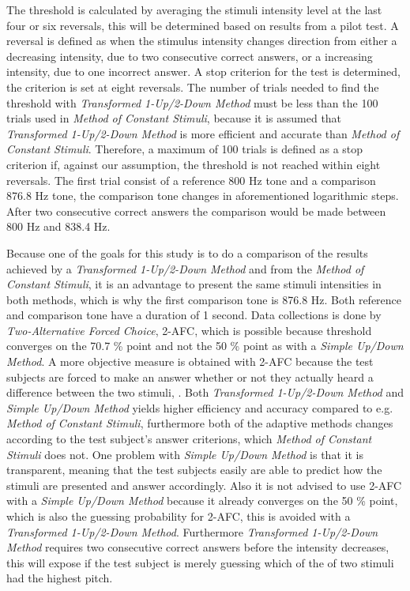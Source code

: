 \noindent
%
The threshold is calculated by averaging the stimuli intensity level at the last four or six reversals, this will be determined based on results from a pilot test. A reversal is defined as when the stimulus intensity changes direction from either a decreasing intensity, due to two consecutive correct answers, or a increasing intensity, due to one incorrect answer. A stop criterion for the test is determined, the criterion is set at eight reversals. The number of trials needed to find the threshold with  \textit{Transformed 1-Up/2-Down Method} must be less than the 100 trials used in \textit{Method of Constant Stimuli}, because it is assumed that \textit{Transformed 1-Up/2-Down Method} is more efficient and accurate than \textit{Method of Constant Stimuli}. Therefore, a maximum of 100 trials is defined as a stop criterion if, against our assumption, the threshold is not reached within eight reversals. The first trial consist of a reference 800 Hz tone and a comparison 876.8 Hz tone, the comparison tone changes in aforementioned logarithmic steps. After two consecutive correct answers the comparison would be made between 800 Hz and 838.4 Hz.

Because one of the goals for this study is to do a comparison of the results achieved by a \textit{Transformed 1-Up/2-Down Method} and from the \textit{Method of Constant Stimuli}, it is an advantage to present the same stimuli intensities in both methods, which is why the first comparison tone is 876.8 Hz. Both reference and comparison tone have a duration of 1 second.\blankline
%               
Data collections is done by \textit{Two-Alternative Forced Choice}, 2-AFC, which is possible because threshold converges on the 70.7 \% point and not the 50 \% point as with a \textit{Simple Up/Down Method}. A more objective measure is obtained with 2-AFC because the test subjects are forced to make an answer whether or not they actually heard a difference between the two stimuli, \parencite[p. 1219]{PDF:PsyphyMethods}.\blankline 
%
Both \textit{Transformed 1-Up/2-Down Method} and \textit{Simple Up/Down Method} yields higher efficiency and accuracy compared to e.g. \textit{Method of Constant Stimuli}, furthermore both of the adaptive methods changes according to the test subject's answer criterions, which \textit{Method of Constant Stimuli} does not. One problem with \textit{Simple Up/Down Method} is that it is transparent, meaning that the test subjects easily are able to predict how the stimuli are presented and answer accordingly. Also it is not advised to use 2-AFC with a \textit{Simple Up/Down Method} because it already converges on the 50 \% point, which is also the guessing probability for 2-AFC, this is avoided with a \textit{Transformed 1-Up/2-Down Method}. Furthermore \textit{Transformed 1-Up/2-Down Method} requires two consecutive correct answers before the intensity decreases, this will expose if the test subject is merely guessing which of the of two stimuli had the highest pitch. 

